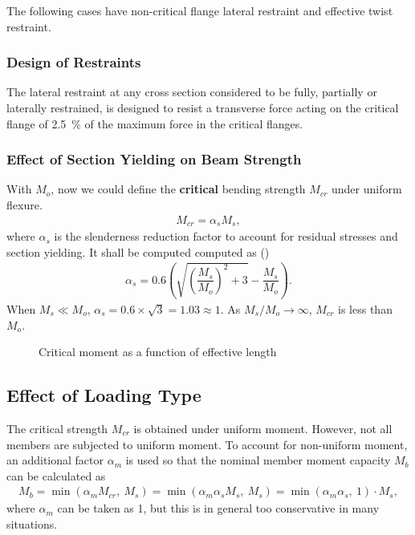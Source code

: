 The following cases have non-critical flange lateral restraint and effective twist restraint.
\begin{figure}[H]
\centering
\end{figure}
\subsubsection{Design of Restraints}
The lateral restraint at any cross section considered to be fully, partially or laterally restrained, is designed to resist a transverse force acting on the critical flange of \SI{2.5}{\percent} of the maximum force in the critical flanges.
\begin{figure}[H]
\centering
\end{figure}
\subsubsection{Effect of Section Yielding on Beam Strength}
With $M_o$, now we could define the \textbf{critical} bending strength $M_{cr}$ under uniform flexure.
\begin{gather}
M_{cr}=\alpha_sM_s,
\end{gather}
where $\alpha_s$ is the slenderness reduction factor to account for residual stresses and section yielding. It shall be computed computed as ()
\begin{gather}
\alpha_s=0.6\left(\sqrt{\left(\dfrac{M_s}{M_o}\right)^2+3}-\dfrac{M_s}{M_o}\right).
\end{gather}
When $M_s\ll{}M_o$, $\alpha_s=0.6\times\sqrt{3}=1.03\approx1$. As $M_s/M_o\rightarrow\infty$, $M_{cr}$ is less than $M_o$.
\begin{figure}[H]
\centering\caption{Critical moment as a function of effective length}
\end{figure}
\subsection{Effect of Loading Type}
The critical strength $M_{cr}$ is obtained under uniform moment. However, not all members are subjected to uniform moment. To account for non-uniform moment, an additional factor $\alpha_m$ is used so that the nominal member moment capacity $M_b$ can be calculated as
\begin{gather}
M_{b}=\min\left(\alpha_mM_{cr},~M_s\right)=\min\left(\alpha_m\alpha_sM_s,~M_s\right)=\min\left(\alpha_m\alpha_s,~1\right)\cdot{}M_s,
\end{gather}
where $\alpha_m$ can be taken as \num{1}, but this is in general too conservative in many situations.

